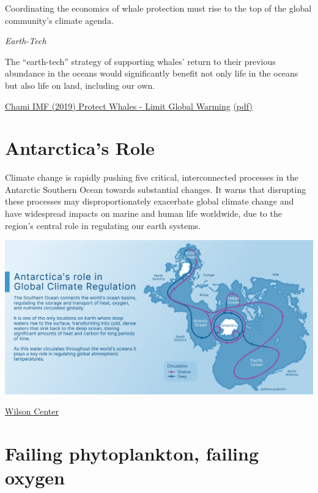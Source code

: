 \documentclass[
]{book}
\begin{document}
Coordinating the economics of whale protection must rise to the top of the global community's climate agenda.

\emph{Earth-Tech}

The ``earth-tech'' strategy of supporting whales' return to their previous abundance in the oceans would significantly benefit not only life in the oceans but also life on land, including our own.

\href{https://www.imf.org/external/pubs/ft/fandd/2019/12/natures-solution-to-climate-change-chami.htm}{Chami IMF (2019) Protect Whales - Limit Global Warming}
\href{pdf/Chami_2021_Whale_Pump.pdf}{(pdf)}

\hypertarget{antarcticas-role}{%
\section{Antarctica's Role}\label{antarcticas-role}}

Climate change is rapidly pushing five critical, interconnected processes in the Antarctic Southern Ocean towards substantial changes. It warns that disrupting these processes may disproportionately exacerbate global climate change and have widespread impacts on marine and human life worldwide, due to the region's central role in regulating our earth systems.

\includegraphics{fig/Antarctica_Circulation.jpeg}

\href{https://www.wilsoncenter.org/publication/polar-perspectives-no-5-climate-change-and-southern-ocean-resilience}{Wilson Center}

\hypertarget{failing-phytoplankton-failing-oxygen}{%
\section{Failing phytoplankton, failing oxygen}\label{failing-phytoplankton-failing-oxygen}}
\end{document}
